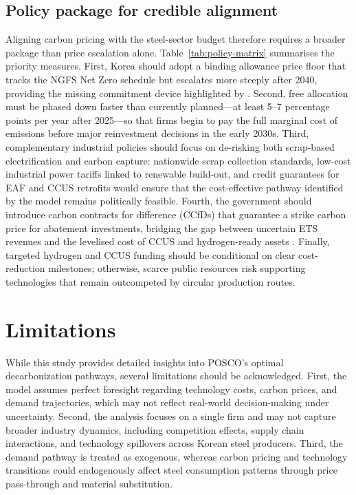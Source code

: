 \documentclass[preprint,1p,authoryear]{elsarticle}
\begin{document}
\subsection{Policy package for credible alignment}

Aligning carbon pricing with the steel-sector budget therefore requires a broader package than price escalation alone. Table~\ref{tab:policy-matrix} summarises the priority measures. First, Korea should adopt a binding allowance price floor that tracks the NGFS Net Zero schedule but escalates more steeply after 2040, providing the missing commitment device highlighted by \citet{fowlie2016carbon}. Second, free allocation must be phased down faster than currently planned—at least 5--7 percentage points per year after 2025—so that firms begin to pay the full marginal cost of emissions before major reinvestment decisions in the early 2030s. Third, complementary industrial policies should focus on de-risking both scrap-based electrification and carbon capture: nationwide scrap collection standards, low-cost industrial power tariffs linked to renewable build-out, and credit guarantees for EAF and CCUS retrofits would ensure that the cost-effective pathway identified by the model remains politically feasible. Fourth, the government should introduce carbon contracts for difference (CCfDs) that guarantee a strike carbon price for abatement investments, bridging the gap between uncertain ETS revenues and the levelised cost of CCUS and hydrogen-ready assets \citep{Neuhoff2019CCfD,Richstein2017CCfD}. Finally, targeted hydrogen and CCUS funding should be conditional on clear cost-reduction milestones; otherwise, scarce public resources risk supporting technologies that remain outcompeted by circular production routes.

\section{Limitations}\label{sec:limitations}

While this study provides detailed insights into POSCO's optimal decarbonization pathways, several limitations should be acknowledged. First, the model assumes perfect foresight regarding technology costs, carbon prices, and demand trajectories, which may not reflect real-world decision-making under uncertainty. Second, the analysis focuses on a single firm and may not capture broader industry dynamics, including competition effects, supply chain interactions, and technology spillovers across Korean steel producers. Third, the demand pathway is treated as exogenous, whereas carbon pricing and technology transitions could endogenously affect steel consumption patterns through price pass-through and material substitution.
\end{document}
